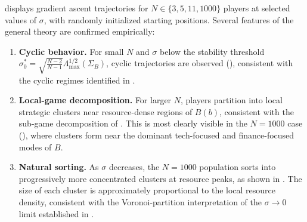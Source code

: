 \documentclass{article}
\begin{document}
         displays gradient ascent trajectories for $N \in \{3, 5, 11, 1000\}$ players at selected values of $\sigma$, with randomly initialized starting positions.
        Several features of the general theory are confirmed empirically:
        \begin{enumerate}
            \item \textbf{Cyclic behavior.}
            For small $N$ and $\sigma$ below the stability threshold $\sigma_0^* = \sqrt{\frac{N-2}{N-1}}\Lambda_{\max}^{1/2}(\Sigma_B)$, cyclic trajectories are observed (), consistent with the cyclic regimes identified in .
            \item \textbf{Local-game decomposition.}
            For larger $N$, players partition into local strategic clusters near resource-dense regions of $B(b)$, consistent with the sub-game decomposition of .
            This is most clearly visible in the $N = 1000$ case (), where clusters form near the dominant tech-focused and finance-focused modes of $B$.
            \item \textbf{Natural sorting.}
            As $\sigma$ decreases, the $N=1000$ population sorts into progressively more concentrated clusters at resource peaks, as shown in .
            The size of each cluster is approximately proportional to the local resource density, consistent with the Voronoi-partition interpretation of the $\sigma \to 0$ limit established in .
        \end{enumerate}
\end{document}
